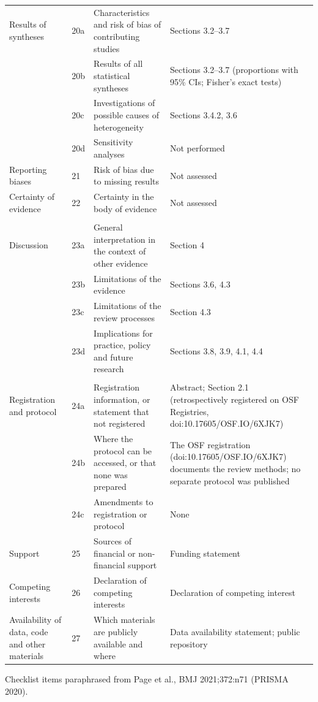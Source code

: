 \begin{longtable}{>{\raggedright\arraybackslash}p{3.6cm} l >{\raggedright\arraybackslash}p{6.2cm} >{\raggedright\arraybackslash}p{5.2cm}}
Results of syntheses & 20a & Characteristics and risk of bias of contributing studies & Sections 3.2--3.7\\
 & 20b & Results of all statistical syntheses & Sections 3.2--3.7 (proportions with 95\% CIs; Fisher's exact tests)\\
 & 20c & Investigations of possible causes of heterogeneity & Sections 3.4.2, 3.6\\
 & 20d & Sensitivity analyses & Not performed\\
Reporting biases & 21 & Risk of bias due to missing results & Not assessed\\
Certainty of evidence & 22 & Certainty in the body of evidence & Not assessed\\
\multicolumn{4}{l}{\textbf{DISCUSSION}}\\
Discussion & 23a & General interpretation in the context of other evidence & Section 4\\
 & 23b & Limitations of the evidence & Sections 3.6, 4.3\\
 & 23c & Limitations of the review processes & Section 4.3\\
 & 23d & Implications for practice, policy and future research & Sections 3.8, 3.9, 4.1, 4.4\\
\multicolumn{4}{l}{\textbf{OTHER INFORMATION}}\\
Registration and protocol & 24a & Registration information, or statement that not registered & Abstract; Section 2.1 (retrospectively registered on OSF Registries, doi:10.17605/OSF.IO/6XJK7)\\
 & 24b & Where the protocol can be accessed, or that none was prepared & The OSF registration (doi:10.17605/OSF.IO/6XJK7) documents the review methods; no separate protocol was published\\
 & 24c & Amendments to registration or protocol & None\\
Support & 25 & Sources of financial or non-financial support & Funding statement\\
Competing interests & 26 & Declaration of competing interests & Declaration of competing interest\\
Availability of data, code and other materials & 27 & Which materials are publicly available and where & Data availability statement; public repository\\
\end{longtable}
\noindent Checklist items paraphrased from Page et al., BMJ 2021;372:n71 (PRISMA 2020).

